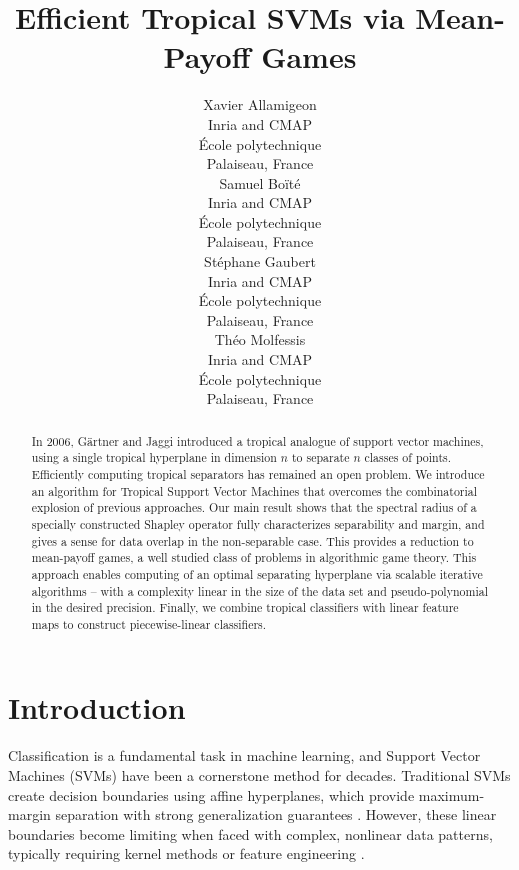 \documentclass{article}
\title{Efficient Tropical SVMs via Mean-Payoff Games}
\author{
  Xavier Allamigeon \\
  Inria and CMAP \\
  École polytechnique \\
  Palaiseau, France \\
  \And
  Samuel Boïté \\
  Inria and CMAP \\
  École polytechnique \\
  Palaiseau, France \\
  \And
  Stéphane Gaubert \\
  Inria and CMAP \\
  École polytechnique \\
  Palaiseau, France \\
  \And
  Théo Molfessis \\
  Inria and CMAP \\
  École polytechnique \\
  Palaiseau, France \\
}
\begin{document}
\maketitle
{}
\begin{abstract}
   In 2006, Gärtner and Jaggi introduced a tropical analogue of support vector machines, using a single tropical hyperplane in dimension $n$ to separate $n$ classes of points. Efficiently computing tropical separators has remained an open problem.
   We introduce an algorithm for Tropical Support Vector Machines that overcomes the combinatorial explosion of previous approaches.
   Our main result shows that the spectral radius of a specially constructed Shapley operator fully characterizes separability and margin, and gives a sense for data overlap in the non-separable case.
   This provides a reduction to mean-payoff games, a well studied class of problems in algorithmic game theory.
   This approach enables computing of an optimal separating hyperplane via scalable iterative algorithms -- with a complexity linear in the size of the data set and pseudo-polynomial in the desired precision.
   Finally, we combine tropical classifiers with linear feature maps to construct piecewise-linear classifiers.
\end{abstract}

\section{Introduction}\label{sec:intro}

Classification is a fundamental task in machine learning, and Support Vector Machines (SVMs) have been a cornerstone method for decades. Traditional SVMs create decision boundaries using affine hyperplanes, which provide maximum-margin separation with strong generalization guarantees \cite{vapnik1999}. However, these linear boundaries become limiting when faced with complex, nonlinear data patterns, typically requiring kernel methods or feature engineering \cite{scholkopf2002}.
\end{document}
